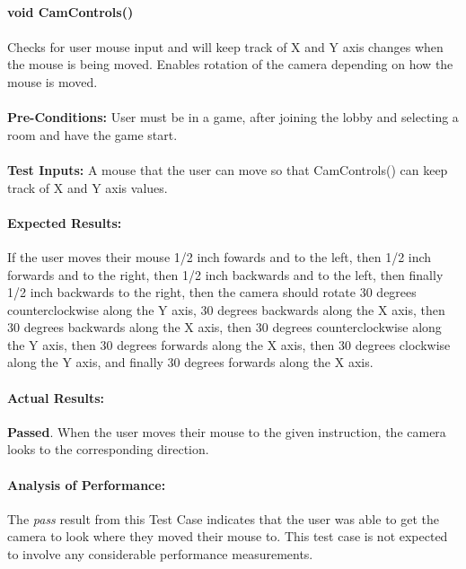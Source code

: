 \documentclass{article}
\begin{document}
    \paragraph{}\textbf{void CamControls()}
    \paragraph{} Checks for user mouse input and will keep track of X and Y axis changes when the mouse is being moved. Enables rotation of the camera depending on how the mouse is moved.
    \paragraph{}\textbf{Pre-Conditions:} User must be in a game, after joining the lobby and selecting a room and have the game start.
    \paragraph{}\textbf{Test Inputs:} A mouse that the user can move so that CamControls() can keep track of X and Y axis values.
    \paragraph{Expected Results:} If the user moves their mouse 1/2 inch fowards and to the left, then 1/2 inch forwards and to the right, then 1/2 inch backwards and to the left, then finally 1/2 inch backwards to the right, then the camera should rotate 30 degrees counterclockwise along the Y axis, 30 degrees backwards along the X axis, then 30 degrees backwards along the X axis, then 30 degrees counterclockwise along the Y axis, then 30 degrees forwards along the X axis, then 30 degrees clockwise along the Y axis, and finally 30 degrees forwards along the X axis.
    \paragraph{Actual Results:} \textbf{Passed}. When the user moves their mouse to the given instruction, the camera looks to the corresponding direction. 
    \paragraph{Analysis of Performance:} The \emph{pass} result from this Test Case indicates that the user was able to get the camera to look where they moved their mouse to. This test case is not expected to involve any considerable performance measurements.
\end{document}
